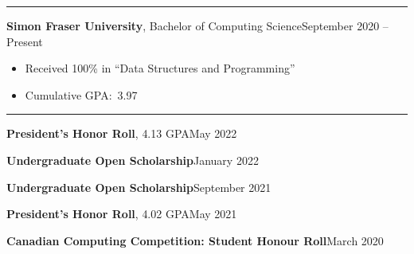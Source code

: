 \documentclass{article}
\newcommand{\entrytitlesimple}[2]{\vspace{0.5em}\textbf{#1}\hfill #2}
\newcommand{\entrytitleskip}{\par\vspace{-0.7em}}
\newcommand{\entrytitle}[3]{\vspace{0.5em}\textbf{#1}, {\small #2}\hfill #3}
\renewcommand{\section}[1]{\vspace{1em}{\Large #1}\vspace{0.3em}\hrule}
\newenvironment{entrybody}{\begin{itemize}[itemsep=0.3em]}{\end{itemize}}
\begin{document}
\section{Education}

\entrytitle{Simon Fraser University}{Bachelor of Computing Science}{September 2020 – Present}
\begin{entrybody}
\item Received 100\% in ``Data Structures and Programming''
\item Cumulative GPA:\ 3.97
\end{entrybody}


\section{Awards}

\entrytitle{President's Honor Roll}{4.13 GPA}{May 2022} \entrytitleskip{}
\entrytitlesimple{Undergraduate Open Scholarship}{January 2022} \entrytitleskip{}
\entrytitlesimple{Undergraduate Open Scholarship}{September 2021} \entrytitleskip{}
\entrytitle{President's Honor Roll}{4.02 GPA}{May 2021} \entrytitleskip{}
\entrytitlesimple{Canadian Computing Competition: Student Honour Roll}{March 2020}
\end{document}
